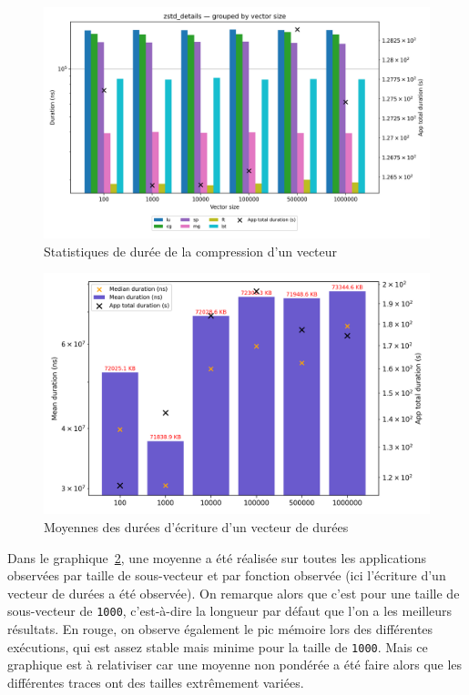 \begin{figure}[!h]
    \centering
    \includegraphics[width=1\textwidth]{img/zstd_details.png}
    \caption{Statistiques de durée de la compression d'un vecteur}
    \label{fig:c}
\end{figure}
\begin{figure}[!h]
    \centering
    \includegraphics[width=1\textwidth]{img/write_dur_subvec_bof.png}
    \caption{Moyennes des durées d'écriture d'un vecteur de durées}
    \label{fig:d}
\end{figure}
Dans le graphique~\ref{fig:d}, une moyenne a été réalisée sur toutes les applications observées par taille de sous-vecteur et par fonction observée (ici l'écriture d'un vecteur de durées a été observée).
On remarque alors que c'est pour une taille de sous-vecteur de \verb!1000!, c'est-à-dire la longueur par défaut que l'on a les meilleurs résultats. 
En rouge, on observe également le pic mémoire lors des différentes exécutions, qui est assez stable mais minime pour la taille de \verb!1000!.
Mais ce graphique est à relativiser car une moyenne non pondérée a été faire alors que les différentes traces ont des tailles extrêmement variées.

